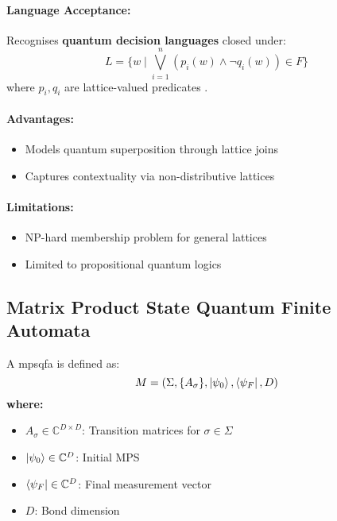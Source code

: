 \paragraph{Language Acceptance:}
Recognises \textbf{quantum decision languages} closed under:
\[
L = \{w \mid \bigvee_{i=1}^n (p_i(w) \land \neg q_i(w)) \in F\}
\]
where $p_i,q_i$ are lattice-valued predicates \cite{gudder1978quantum}.

\paragraph{Advantages:}
\begin{itemize}
    \item Models quantum superposition through lattice joins
    \item Captures contextuality via non-distributive lattices
\end{itemize}

\paragraph{Limitations:}
\begin{itemize}
    \item NP-hard membership problem for general lattices
    \item Limited to propositional quantum logics
\end{itemize}

\subsection{Matrix Product State Quantum Finite Automata}
\label{subsec:mpsqfa}

\begin{definition}
A \gls{mpsqfa} is defined as:
\[
M = (\Sigma, \{A_\sigma\}, \ket{\psi_0}, \bra{\psi_F}, D)
\]
\textbf{where:}
\begin{itemize}
    \item $A_\sigma \in \mathbb{C}^{D \times D}$: Transition matrices for $\sigma \in \Sigma$
    \item $\ket{\psi_0} \in \mathbb{C}^D$: Initial MPS
    \item $\bra{\psi_F} \in \mathbb{C}^D$: Final measurement vector
    \item $D$: Bond dimension
\end{itemize}
\end{definition}

